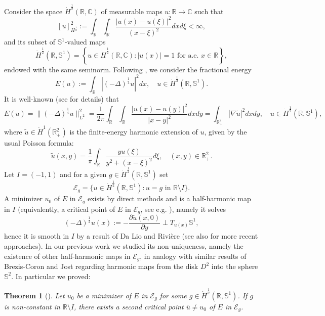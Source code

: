 \documentclass[12pt, a4paper]{article}
\newtheorem{thmx}{Theorem}
\newcommand{\sph}{\mathbb{S}}
\newcommand{\R}{\mathbb{R}}
\renewcommand{\(}{\left(}
\renewcommand{\)}{\right)}
\begin{document}
 Consider the space $\dot H^{\frac12}(\R, \mathbb{C})$ of measurable maps $u:\R\to \mathbb{C}$ such that 
$$[u]_{H^{\frac{1}{2}}}^2:= \int_{\R}\int_{\R}\frac{|u(x)-u(\xi)|^2}{(x-\xi)^2}dxd\xi<\infty,$$
and its subset of $\sph^1$-valued maps
$$\dot H^{\frac12}(\R, \sph^1) = \left\{u\in \dot H^{\frac12}(\R, \mathbb{C}): |u(x)|=1 \text{ for a.e. }x\in\R\right\},$$
endowed with the same seminorm. 
Following \cite{DLR}, we consider the fractional energy
\begin{equation}\label{12energy}
E(u):=\int_{\R}\left|(-\Delta)^\frac14u\right|^2dx, \quad u\in \dot H^{\frac12}(\R, \sph^1).
\end{equation}
It is well-known  (see \cite{HM} for details) that
\begin{equation}\label{12energybis}
E(u)=\|(-\Delta)^\frac14 u\|_{L^2}^2=\frac{1}{2\pi}\int_{\R}\int_{\R}\frac{|u(x)-u(y)|^2}{|x-y|^2}dxdy = \int_{\R^2_+} |\nabla \tilde u|^2 dx dy,\quad u\in \dot H^{\frac12}(\R, \sph^1),
\end{equation}
where $\tilde u\in \dot H^1(\R^2_+)$ is the finite-energy harmonic extension of $u$, given by the usual Poisson formula:
$$\tilde u(x,y)=\frac{1}{\pi} \int_\R\frac{yu(\xi)}{y^2+(x-\xi)^2}d\xi,\quad (x,y)\in \R^2_+.$$
Let $I=(-1,1)$ and for a given $g\in \dot H^{\frac12}(\R, \sph^1)$ set
$$\mathcal{E}_g= \{u\in \dot H^{\frac12}(\R, \sph^1):u=g\text{ in }\R\setminus I\}.$$
A minimizer $u_0$ of $E$ in $\mathcal{E}_g$ exists by direct methods and is a half-harmonic map in $I$ (equivalently, a critical point of $E$ in $\mathcal{E}_g$, see e.g. \cite{milsir}), namely it solves
$$(-\Delta)^\frac12 u(x):=-\frac{\partial \tilde u(x,0)}{\partial y}\perp T_{u(x)}\sph^1,$$
hence it is smooth in $I$ by a result of Da Lio and Rivi\`ere \cite{DLR} (see also \cite{MazSch0,MazSch2,milpeg,milpegsch,milsir, Sch2} for more recent approaches). In our previous work \cite{HM} we studied its non-uniqueness, namely the existence of other half-harmonic maps in $\mathcal{E}_g$, in analogy with similar results of Brezis-Coron \cite{bc} and Jost \cite{jost} regarding harmonic maps from the disk $D^2$ into the sphere $\sph^2$. In particular we proved:

\begin{thmx}[\cite{HM}]\label{thmx1} Let $u_0$ be a minimizer of $E$ in $\mathcal{E}_g$ for some $g\in \dot H^{\frac12}(\R,\sph^1)$. If $g$ is non-constant in $\R\setminus I$, there exists a second critical point $\bar u\ne u_0$ of $E$ in $\mathcal{E}_g$.
\end{thmx}
\end{document}
